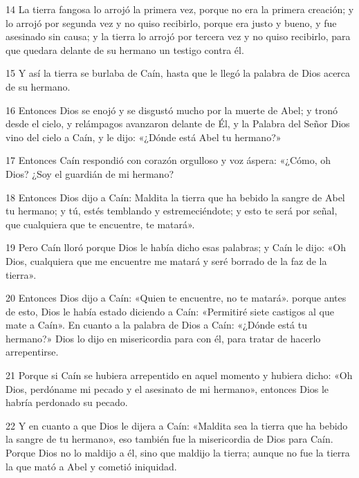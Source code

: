 \par 14 La tierra fangosa lo arrojó la primera vez, porque no era la primera creación; y lo arrojó por segunda vez y no quiso recibirlo, porque era justo y bueno, y fue asesinado sin causa; y la tierra lo arrojó por tercera vez y no quiso recibirlo, para que quedara delante de su hermano un testigo contra él.

\par 15 Y así la tierra se burlaba de Caín, hasta que le llegó la palabra de Dios acerca de su hermano.

\par 16 Entonces Dios se enojó y se disgustó mucho por la muerte de Abel; y tronó desde el cielo, y relámpagos avanzaron delante de Él, y la Palabra del Señor Dios vino del cielo a Caín, y le dijo: «¿Dónde está Abel tu hermano?»

\par 17 Entonces Caín respondió con corazón orgulloso y voz áspera: «¿Cómo, oh Dios? ¿Soy el guardián de mi hermano?

\par 18 Entonces Dios dijo a Caín: Maldita la tierra que ha bebido la sangre de Abel tu hermano; y tú, estés temblando y estremeciéndote; y esto te será por señal, que cualquiera que te encuentre, te matará».

\par 19 Pero Caín lloró porque Dios le había dicho esas palabras; y Caín le dijo: «Oh Dios, cualquiera que me encuentre me matará y seré borrado de la faz de la tierra».

\par 20 Entonces Dios dijo a Caín: «Quien te encuentre, no te matará». porque antes de esto, Dios le había estado diciendo a Caín: «Permitiré siete castigos al que mate a Caín». En cuanto a la palabra de Dios a Caín: «¿Dónde está tu hermano?» Dios lo dijo en misericordia para con él, para tratar de hacerlo arrepentirse.

\par 21 Porque si Caín se hubiera arrepentido en aquel momento y hubiera dicho: «Oh Dios, perdóname mi pecado y el asesinato de mi hermano», entonces Dios le habría perdonado su pecado.

\par 22 Y en cuanto a que Dios le dijera a Caín: «Maldita sea la tierra que ha bebido la sangre de tu hermano», eso también fue la misericordia de Dios para Caín. Porque Dios no lo maldijo a él, sino que maldijo la tierra; aunque no fue la tierra la que mató a Abel y cometió iniquidad.

